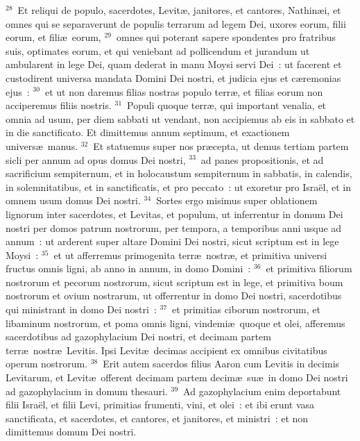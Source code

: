 ${}^{28}$~Et reliqui de populo, sacerdotes, Levit\ae , janitores, et cantores, Nathin\ae i, et omnes qui se separaverunt de populis terrarum ad legem Dei, uxores eorum, filii eorum, et fili\ae\ eorum,
${}^{29}$~omnes qui poterant sapere spondentes pro fratribus suis, optimates eorum, et qui veniebant ad pollicendum et jurandum ut ambularent in lege Dei, quam dederat in manu Moysi servi Dei~: ut facerent et custodirent universa mandata Domini Dei nostri, et judicia ejus et c\ae remonias ejus~:
${}^{30}$~et ut non daremus filias nostras populo terr\ae , et filias eorum non acciperemus filiis nostris.
${}^{31}$~Populi quoque terr\ae , qui important venalia, et omnia ad usum, per diem sabbati ut vendant, non accipiemus ab eis in sabbato et in die sanctificato. Et dimittemus annum septimum, et exactionem univers\ae\ manus.
${}^{32}$~Et statuemus super nos pr\ae cepta, ut demus tertiam partem sicli per annum ad opus domus Dei nostri,
${}^{33}$~ad panes propositionis, et ad sacrificium sempiternum, et in holocaustum sempiternum in sabbatis, in calendis, in solemnitatibus, et in sanctificatis, et pro peccato~: ut exoretur pro Isra\"el, et in omnem usum domus Dei nostri.
${}^{34}$~Sortes ergo misimus super oblationem lignorum inter sacerdotes, et Levitas, et populum, ut inferrentur in domum Dei nostri per domos patrum nostrorum, per tempora, a temporibus anni usque ad annum~: ut arderent super altare Domini Dei nostri, sicut scriptum est in lege Moysi~:
${}^{35}$~et ut afferremus primogenita terr\ae\ nostr\ae , et primitiva universi fructus omnis ligni, ab anno in annum, in domo Domini~:
${}^{36}$~et primitiva filiorum nostrorum et pecorum nostrorum, sicut scriptum est in lege, et primitiva boum nostrorum et ovium nostrarum, ut offerrentur in domo Dei nostri, sacerdotibus qui ministrant in domo Dei nostri~:
${}^{37}$~et primitias ciborum nostrorum, et libaminum nostrorum, et poma omnis ligni, vindemi\ae\ quoque et olei, afferemus sacerdotibus ad gazophylacium Dei nostri, et decimam partem terr\ae\ nostr\ae\ Levitis. Ipsi Levit\ae\ decimas accipient ex omnibus civitatibus operum nostrorum.
${}^{38}$~Erit autem sacerdos filius Aaron cum Levitis in decimis Levitarum, et Levit\ae\ offerent decimam partem decim\ae\ su\ae\ in domo Dei nostri ad gazophylacium in domum thesauri.
${}^{39}$~Ad gazophylacium enim deportabunt filii Isra\"el, et filii Levi, primitias frumenti, vini, et olei~: et ibi erunt vasa sanctificata, et sacerdotes, et cantores, et janitores, et ministri~: et non dimittemus domum Dei nostri.

